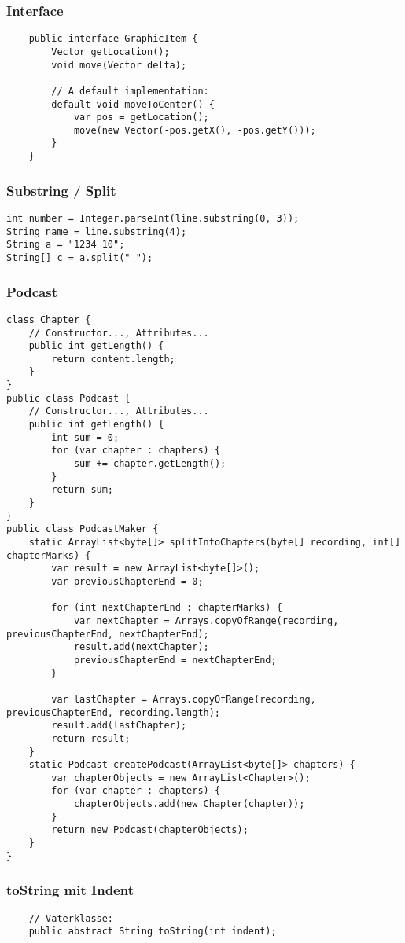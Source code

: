 \begin{multicols*}{5}
	\subsubsection{Interface}
	\begin{lstlisting}
	public interface GraphicItem {
		Vector getLocation();
		void move(Vector delta);
		
		// A default implementation:
		default void moveToCenter() {
			var pos = getLocation();
			move(new Vector(-pos.getX(), -pos.getY()));
		}
	}
	\end{lstlisting}

	\subsubsection{Substring / Split}
		\begin{lstlisting}
int number = Integer.parseInt(line.substring(0, 3));
String name = line.substring(4);
String a = "1234 10"; 
String[] c = a.split(" ");
		\end{lstlisting}


	\subsubsection{Podcast}
	\begin{lstlisting}
class Chapter {
	// Constructor..., Attributes...
	public int getLength() {
		return content.length;
	}
}
public class Podcast {
	// Constructor..., Attributes...
	public int getLength() {
		int sum = 0;
		for (var chapter : chapters) {
			sum += chapter.getLength();
		}
		return sum;
	}
}
public class PodcastMaker {
	static ArrayList<byte[]> splitIntoChapters(byte[] recording, int[] chapterMarks) {
		var result = new ArrayList<byte[]>();
		var previousChapterEnd = 0;
		
		for (int nextChapterEnd : chapterMarks) {
			var nextChapter = Arrays.copyOfRange(recording, previousChapterEnd, nextChapterEnd);
			result.add(nextChapter);
			previousChapterEnd = nextChapterEnd;
		}
		
		var lastChapter = Arrays.copyOfRange(recording, previousChapterEnd, recording.length);
		result.add(lastChapter);
		return result;
	}
	static Podcast createPodcast(ArrayList<byte[]> chapters) {
		var chapterObjects = new ArrayList<Chapter>();
		for (var chapter : chapters) {
			chapterObjects.add(new Chapter(chapter));
		}
		return new Podcast(chapterObjects);
	}
}
	\end{lstlisting}

	\subsubsection{toString mit Indent}
	\begin{lstlisting}
	// Vaterklasse:
	public abstract String toString(int indent);			
	

\end{lstlisting}
\end{multicols*}
